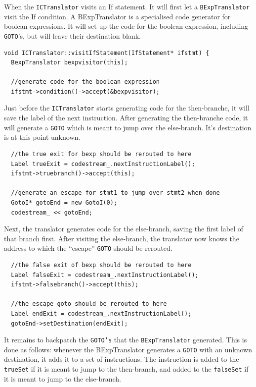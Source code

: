\documentclass[a4paper]{article}
\begin{document}
When the \texttt{ICTranslator} visits an If statement. It will first let a
\texttt{BExpTranslator} visit the If condition. A BExpTranslator is a
specialised code generator for boolean expressions. It will set up the code
for the boolean expression, including \texttt{GOTO}'s, but will leave their destination
blank.

\begin{verbatim}
void ICTranslator::visitIfStatement(IfStatement* ifstmt) {
  BexpTranslator bexpvisitor(this);

  //generate code for the boolean expression
  ifstmt->condition()->accept(&bexpvisitor);
\end{verbatim}

Just before the \texttt{ICTranslator} starts generating code for the
then-branche, it will save the label of the next instruction. After generating
the then-branche code, it will generate a \texttt{GOTO} which is meant to jump
over the else-branch. It's destination is at this point unknown.

\begin{verbatim}
  //the true exit for bexp should be rerouted to here
  Label trueExit = codestream_.nextInstructionLabel();
  ifstmt->truebranch()->accept(this);

  //generate an escape for stmt1 to jump over stmt2 when done
  GotoI* gotoEnd = new GotoI(0);
  codestream_ << gotoEnd;
\end{verbatim}

Next, the translator generates code for the else-branch, saving the first
label of that branch first. After visiting the else-branch, the translator now
knows the address to which the ``escape'' \texttt{GOTO} should be rerouted.

\begin{verbatim}
  //the false exit of bexp should be rerouted to here
  Label falseExit = codestream_.nextInstructionLabel();
  ifstmt->falsebranch()->accept(this);

  //the escape goto should be rerouted to here
  Label endExit = codestream_.nextInstructionLabel();
  gotoEnd->setDestination(endExit);
\end{verbatim}

It remains to backpatch the \texttt{GOTO's} that the \texttt{BExpTranslator}
generated. This is done as follows: whenever the BExpTranslator generates a
\texttt{GOTO} with an unknown destination, it adds it to a set of
instructions. The instruction is added to the \texttt{trueSet} if it is meant
to jump to the then-branch, and added to the \texttt{falseSet} if it is meant
to jump to the else-branch.
\end{document}
